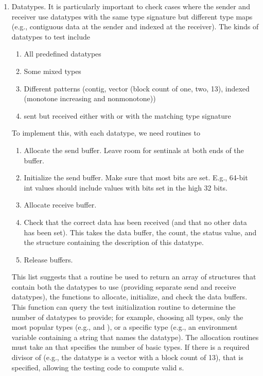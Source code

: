 \documentclass{article}
\begin{document}
\begin{enumerate}

\item Datatypes. It is particularly important to check cases where the
sender and receiver use datatypes with the same type signature but 
different type maps (e.g., contiguous data at the sender and indexed
at the receiver).  The kinds of datatypes to test include

     \begin{enumerate}
     \item All predefined datatypes
     \item Some mixed types
     \item Different patterns (contig, vector (block count of one,
           two, 13), indexed (monotone
           increasing and nonmonotone)) 
     \item {} sent but received either with
            or with the matching type signature
     \end{enumerate}
     To implement this, with each datatype, we need routines to
     \begin{enumerate}
     \item Allocate the send buffer.  Leave room for sentinals at both
     ends of the buffer.
     \item Initialize the send buffer.  Make sure that most bits are
           set.  E.g., 64-bit int values should include values with
           bits set in the high 32 bits.
     \item Allocate receive buffer.
     \item Check that the correct data has been received (and that no
           other data has been set).  This takes the data buffer, the
           count, the status value, and the structure containing the
           description of this datatype.
     \item Release buffers.
     \end{enumerate}
     This list suggests that a routine be used to return an array of
     structures that contain both the datatypes to use (providing
     separate send and receive datatypes), the functions to allocate,
     initialize, and check the data buffers.  This function can query
     the test initialization routine to determine the number of
     datatypes to provide; for example, choosing all types, only the
     most popular types (e.g.,  and ),
     or a specific type (e.g., an environment variable containing a
     string that names the datatype).  The allocation routines must
     take an  that specifies the number of basic
     types.  If there is a required divisor of  (e.g., the
     datatype is a vector with a block count of 13), that is
     specified, allowing the testing code to compute valid
     s.


\end{enumerate}
\end{document}
